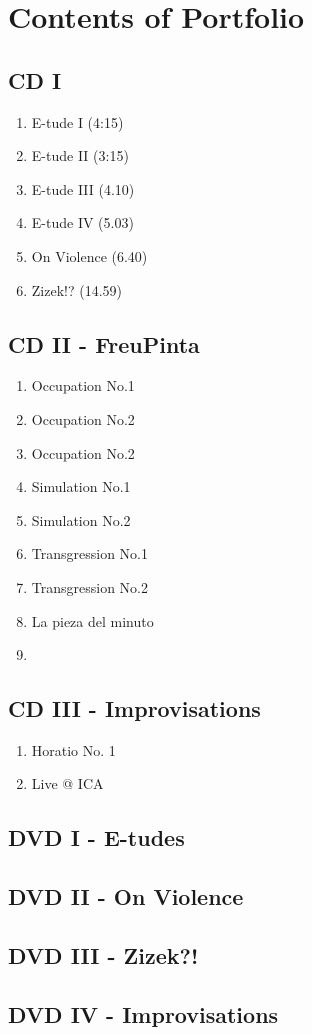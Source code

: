 \chapter*{Contents of Portfolio}

\section*{CD I}

\begin{enumerate}
\item E-tude I (4:15)
\item E-tude II (3:15)
\item E-tude III (4.10)
\item E-tude IV (5.03)
\item On Violence (6.40)
\item Zizek!? (14.59)
\end{enumerate}

\section*{CD II - FreuPinta}

\begin{enumerate}
\item Occupation No.1
\item Occupation No.2
\item Occupation No.2
\item Simulation No.1
\item Simulation No.2
\item Transgression No.1
\item Transgression No.2
\item La pieza del minuto
\item 
\end{enumerate}

\section*{CD III - Improvisations}

\begin{enumerate}
\item Horatio No. 1 
\item Live @ ICA
\end{enumerate}

\section*{DVD I - E-tudes}

\section*{DVD II - On Violence}

\section*{DVD III - Zizek?!}

\section*{DVD IV - Improvisations}

